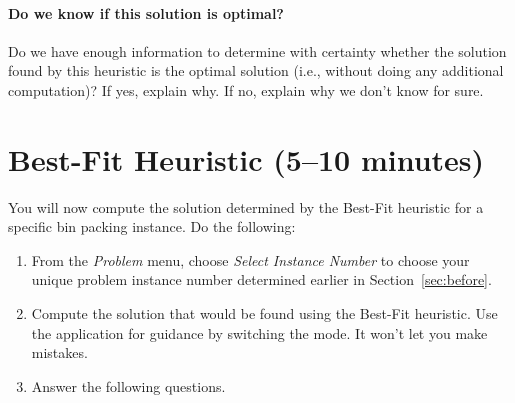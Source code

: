 \documentclass[11pt,letterpaper]{article}
\begin{document}
\paragraph*{Do we know if this solution is optimal?} Do we have enough 
information to determine with certainty whether the solution found by
this heuristic is the optimal solution (i.e., without doing any additional
computation)? If yes, explain why. If no, explain why we don't know for sure.

\vspace*{0.5in}


\newpage

\section{Best-Fit Heuristic (5--10 minutes)}\label{sec:bf}


You will now compute the solution determined by the Best-Fit
heuristic for a specific bin packing instance. Do the following:
\begin{enumerate}[leftmargin=*, parsep=0pt, itemsep=2pt, topsep=2pt, partopsep=0pt]
\item From the {\em Problem} menu, choose {\em Select Instance Number}
to choose your unique problem instance number determined earlier in 
Section~\ref{sec:before}.
\item Compute the solution that would be found using the Best-Fit 
heuristic. Use the application for guidance by switching the mode.
It won't let you make mistakes.
\item Answer the following questions.
\end{enumerate}
\end{document}
